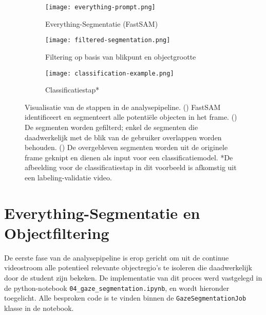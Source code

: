 \begin{figure}[H]
    \centering
        \begin{subfigure}[b]{0.75\textwidth}
        \centering
        \texttt{[image: everything-prompt.png]}
        \caption{Everything-Segmentatie (FastSAM)}
        \label{fig:pipeline_stap_a}
    \end{subfigure}

    \vspace{0.5cm}

    \begin{subfigure}[b]{0.75\textwidth}
    \centering
    \texttt{[image: filtered-segmentation.png]}
    \caption{Filtering op basis van blikpunt en objectgrootte}
    \label{fig:pipeline_stap_b}
    \end{subfigure}

    \vspace{0.5cm}

    \begin{subfigure}[b]{0.75\textwidth}
        \centering
        \texttt{[image: classification-example.png]}
        \caption{Classificatiestap*}
        \label{fig:pipeline_stap_c}
    \end{subfigure}
    \caption[Visualisatie van de Analysepipeline]{
        \label{fig:analyse-pipeline-visualisatie}
        Visualisatie van de stappen in de analysepipeline.
        () FastSAM identificeert en segmenteert alle potentiële objecten in het frame.
        () De segmenten worden gefilterd; enkel de segmenten die daadwerkelijk met de blik van de gebruiker overlappen worden behouden.
        () De overgebleven segmenten worden uit de originele frame geknipt en dienen als input voor een classificatiemodel.
        *De afbeelding voor de classificatiestap in dit voorbeeld is afkomstig uit een labeling-validatie video.
    }
\end{figure}

\section{Everything-Segmentatie en Objectfiltering}

De eerste fase van de analysepipeline is erop gericht om uit de continue videostroom alle potentieel relevante objectregio's 
te isoleren die daadwerkelijk door de student zijn bekeken. 
De implementatie van dit proces werd vastgelegd in de python-notebook \texttt{04\_gaze\_segmentation.ipynb},
en wordt hieronder toegelicht.
Alle besproken code is te vinden binnen de \texttt{GazeSegmentationJob} klasse in de notebook.

